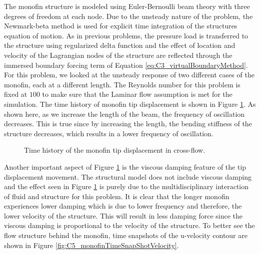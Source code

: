 The monofin structure is modeled using Euler-Bernoulli beam theory with three degrees of freedom at each node. Due to the unsteady nature of the problem, the Newmark-beta method is used for explicit time integration of the structures equation of motion. As in previous problems, the pressure load is transferred to the structure using regularized delta function and the effect of location and velocity of the Lagrangian nodes of the structure are reflected through the immersed boundary forcing term of Equation \eqref{eq:C3_virtualBoundaryMethod}. For this problem, we looked at the unsteady response of two different cases of the monofin, each at a different length. The Reynolds number for this problem is fixed at $100$ to make sure that the Laminar flow assumption is met for the simulation. The time history of monofin tip displacement is shown in Figure \ref{fig:C5_timeHistoryTipDisplacement}. As shown here, as we increase the length of the beam, the frequency of oscillation decreases. This is true since by increasing the length, the bending stiffness of the structure decreases, which results in a lower frequency of oscillation.
%
\begin{figure}[H]
    \centering
    \quad
    \caption{Time history of the monofin tip displacement in cross-flow.}
    \label{fig:C5_timeHistoryTipDisplacement}
\end{figure}
%
Another important aspect of Figure \ref{fig:C5_timeHistoryTipDisplacement} is the viscous damping feature of the tip displacement movement. The structural model does not include viscous damping and the effect seen in Figure \ref{fig:C5_timeHistoryTipDisplacement} is purely due to the multidisciplinary interaction of fluid and structure for this problem. It is clear that the longer monofin experiences lower damping which is due to lower frequency and therefore, the lower velocity of the structure. This will result in less damping force since the viscous damping is proportional to the velocity of the structure. To better see the flow structure behind the monofin, time snapshots of the u-velocity contour are shown in Figure \ref{fig:C5_monofinTimeSnapShotVelocity}.
